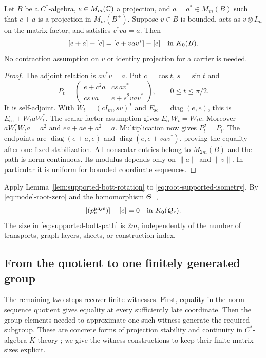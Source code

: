 \begin{lemma}\label{lem:supported-bott-rotation}
Let $B$ be a $C^*$-algebra, $e\in M_m(\mathbb C)$ a projection, and
$a=a^*\in M_m(B)$ such that $e+a$ is a projection in $M_m(B^+)$.
Suppose $v\in B$ is bounded, acts as $v\otimes I_m$ on the matrix factor,
and satisfies $v^*va=a$.  Then
\[
 [e+a]-[e]=[e+vav^*]-[e]\quad\hbox{in }K_0(B).
\]
No contraction assumption on $v$ or identity projection for a carrier is
needed.
\end{lemma}

\begin{proof}
The adjoint relation is $av^*v=a$.  Put $c=\cos t$, $s=\sin t$ and
\begin{equation}\label{eq:supported-bott-path}
 P_t=\begin{pmatrix}
 e+c^2a&cs\,av^*\\cs\,va&e+s^2vav^*
 \end{pmatrix},\qquad 0\le t\le\pi/2.
\end{equation}
It is self-adjoint.  With $W_t=(cI_m,sv)^T$ and
$E_{\mathrm{sc}}=\operatorname{diag}(e,e)$, this is
$E_{\mathrm{sc}}+W_taW_t^*$.  The scalar-factor assumption gives
$E_{\mathrm{sc}}W_t=W_te$.  Moreover
$aW_t^*W_ta=a^2$ and $ea+ae+a^2=a$.  Multiplication now gives
$P_t^2=P_t$.  The endpoints are
$\operatorname{diag}(e+a,e)$ and
$\operatorname{diag}(e,e+vav^*)$, proving the equality after one
fixed stabilization.  All nonscalar entries belong to $M_{2m}(B)$ and the
path is norm continuous.  Its modulus depends only on $\|a\|$ and
$\|v\|$.  In particular it is uniform for bounded coordinate sequences.
\end{proof}

Apply Lemma~\ref{lem:supported-bott-rotation} to
\eqref{eq:root-supported-isometry}.  By
\eqref{eq:model-root-zero} and the homomorphism $\Theta^+$,
\begin{equation}\label{eq:physical-bott-quotient-zero}
 [(p_\nu^{\mathrm{phys}})]-[e]=0
       \quad\hbox{in }K_0(\mathcal Q_r).
\end{equation}
The size in \eqref{eq:supported-bott-path} is $2m$, independently of the
number of transports, graph layers, sheets, or construction index.

\subsection{From the quotient to one finitely generated group}

The remaining two steps recover finite witnesses.  First, equality in the
norm sequence quotient gives equality at every sufficiently late
coordinate.  Then the group elements needed to approximate one such
witness generate the required subgroup.  These are concrete forms of
projection stability and continuity in $C^*$-algebra $K$-theory
\cite[Sections~4.5 and~5.2, Theorem~5.6.1]{Blackadar98}; we give the
witness constructions to keep their finite matrix sizes explicit.

